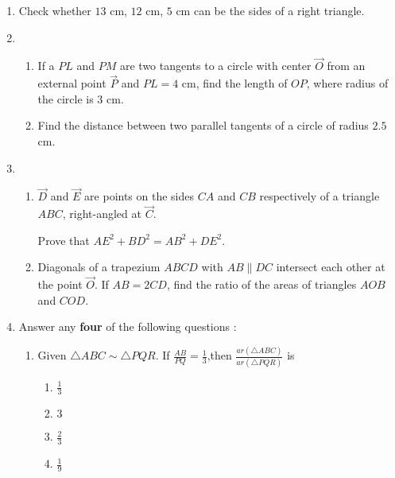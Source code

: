 %
\begin{enumerate}
\item Check whether $13$ cm, $12$ cm, $5$ cm can be the sides of a right triangle.
\item \begin{enumerate}
    \item If a $PL$ and $PM$ are two tangents to a circle with center $\vec{O}$ from an external point $\vec{P}$ and $PL=4$ cm, find the length of $OP$, where radius of the circle is $3$ cm.
    \item Find the distance between two parallel tangents of a circle of radius $2.5$ cm.
\end{enumerate}
    \item 
    \begin{enumerate}
    \item $\vec{D}$ and $\vec{E}$ are points on the sides $CA$ and $CB$ respectively of  a triangle $ABC$, right-angled at $\vec{C}$.
    
    Prove that $AE^2+BD^2=AB^2+DE^2$.
    
    \item Diagonals of a trapezium $ABCD$ with $AB\parallel DC$ intersect each other at the point $\vec{O}$. If $AB=2CD$, find the ratio of the areas of triangles $AOB$ and $COD$.
    \end{enumerate}

    \item Answer any \textbf{four} of the following questions :
      \begin{enumerate}[label=(\roman*)]
        \item Given $\triangle ABC \sim \triangle PQR$. If $\frac{AB}{PQ}=\frac{1}{3}$,then $\frac{ar(\triangle ABC)}{ar(\triangle PQR)}$ is 
        \begin{enumerate}[label=(\Alph*)]
            \item $\frac{1}{3}$
            \item $3$
            \item $\frac{2}{3}$
            \item $\frac{1}{9}$
        \end{enumerate}
        

\end{enumerate}
\end{enumerate}
